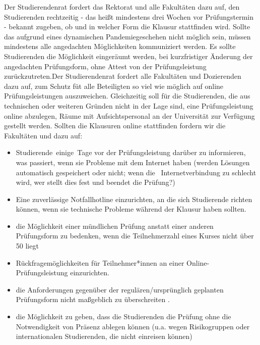     {
        Der Studierendenrat fordert das Rektorat und alle Fakultäten dazu auf, den
        Studierenden rechtzeitig
        - das heißt mindestens drei Wochen vor Prüfungstermin - bekannt zugeben, ob und in welcher
        Form die
        Klausur stattfinden wird. Sollte das aufgrund eines dynamischen Pandemiegeschehen
        nicht möglich
        sein, müssen mindestens alle angedachten Möglichkeiten kommuniziert werden.
        Es sollte Studierenden die Möglichkeit
        eingeräumt werden,
        bei kurzfristiger Änderung der angedachten Prüfungsform, ohne Attest von der
        Prüfungsleistung
        zurückzutreten.Der Studierendenrat fordert alle Fakultäten und Dozierenden dazu auf, zum Schutz füt
        alle
        Beteiligten so viel wie möglich auf online Prüfungsleistungen auszuweichen.
        Gleichzeitig
        soll für die Studierenden, die aus technischen oder weiteren Gründen nicht in der
        Lage sind, eine
        Prüfungsleistung online abzulegen, Räume mit Aufsichtspersonal an der Universität
        zur Verfügung
        gestellt werden.
        Sollten die Klausuren online stattfinden fordern wir die Fakultäten und  dazu auf:
        \begin{itemize}
            \item Studierende einige Tage vor der Prüfungsleistung darüber zu informieren, was passiert, wenn sie Probleme mit dem Internet haben (werden Lösungen automatisch gespeichert oder nicht; wenn die  Internetverbindung zu schlecht wird, wer stellt dies fest und beendet die Prüfung?)
            \item Eine zuverlässige Notfallhotline einzurichten, an die sich Studierende richten können, wenn sie technische Probleme während der Klausur haben sollten.
            \item die Möglichkeit einer mündlichen Prüfung anstatt einer anderen Prüfungsform zu bedenken, wenn die Teilnehmerzahl eines Kurses nicht über 50 liegt
            \item Rückfragemöglichkeiten für Teilnehmer*innen an einer Online-Prüfungsleistung einzurichten.
            \item die Anforderungen gegenüber der regulären/ursprünglich geplanten Prüfungsform nicht maßgeblich zu überschreiten .
            \item die Möglichkeit zu geben, dass die Studierenden die Prüfung ohne die Notwendigkeit von Präsenz ablegen können (u.a. wegen Risikogruppen oder internationalen Studierenden, die nicht einreisen können)

\end{itemize}}
